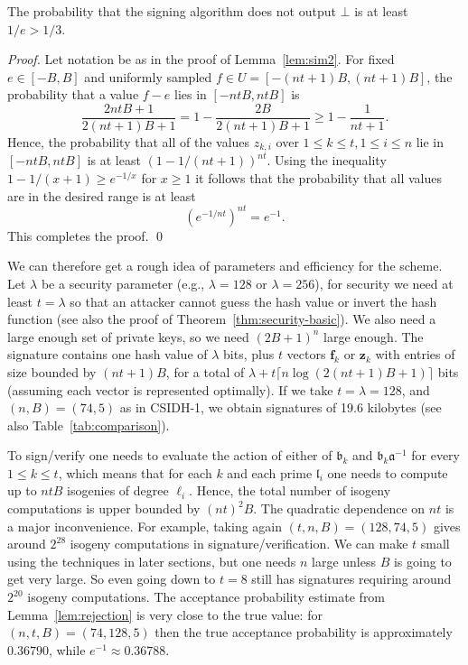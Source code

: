 \documentclass{llncs}
\renewcommand{\a}{\mathfrak{a}}
\renewcommand{\b}{\mathfrak{b}}
\renewcommand{\l}{\mathfrak{l}}
\newcommand{\f}{\mathbf{f}}
\newcommand{\z}{\mathbf{z}}
\begin{document}
\begin{lemma}\label{lem:rejection}
The probability that the signing algorithm does not output $\bot$ is at least $1/e > 1/3$.
\end{lemma}

\begin{proof}
Let notation be as in the proof of Lemma~\ref{lem:sim2}.
For fixed $e \in [-B, B]$ and uniformly sampled $f \in U = [-(nt+1)B, (nt+1)B]$, the probability that a value $f-e$ lies in $[-ntB, ntB]$ is
\[
   \frac{2ntB + 1}{2(nt+1)B + 1}  = 1 - \frac{2B}{2(nt+1)B + 1} \ge 1 - \frac{1}{nt+1}.
\]
Hence, the probability that all of the values $z_{k,i}$ over $1 \le k \le t, 1 \le i \le n$ lie in $[-ntB, ntB]$ is at least $(1 - 1/(nt+1))^{nt}$.
Using the inequality $1 - 1/(x+1) \ge e^{-1/x}$ for $x \ge 1$ it follows that the probability that all values are in the desired range is at least
\[
   \left( e^{-1/nt} \right)^{nt} = e^{-1}.
\]
This completes the proof. \qed
\end{proof}





We can therefore get a rough idea of parameters and efficiency for the scheme.
Let $\lambda$ be a security parameter (e.g., $\lambda=128$ or $\lambda=256$), for security
we need at least $t=\lambda$ so that an attacker cannot guess the hash value or invert the hash function (see also the proof of Theorem~\ref{thm:security-basic}).
We also need a large enough set of private keys, so we need $(2B+1)^n$ large enough.
The signature contains one hash value of $\lambda$ bits, plus $t$ vectors $\f_k$ or $\z_k$ with entries of size bounded by $(nt+1)B$, for a total of $\lambda + t\lceil n\log(2(nt+1)B + 1)\rceil$ bits (assuming each vector is represented optimally). If we take $t=\lambda=128$, and $(n,B)=(74,5)$ as in CSIDH-1, we obtain signatures of 19.6 kilobytes (see also Table~\ref{tab:comparison}).

To sign/verify one needs to evaluate the action of either of $\b_k$ and $\b_k\a^{-1}$ for every $1\le k\le t$,
which means that for each $k$ and each prime $\l_i$ one needs to compute up to $ntB$ isogenies of degree $\ell_i$.
Hence, the total number of isogeny computations is upper bounded by $(nt)^2 B$.
The quadratic dependence on $nt$ is a major inconvenience.
For example, taking again $(t,n,B)=(128,74,5)$ gives around $2^{28}$ isogeny computations in signature/verification.
We can make $t$ small using the techniques in later sections, but one needs $n$ large unless $B$ is going to get very large. So even going down to $t=8$ still has signatures requiring around $2^{20}$ isogeny computations.
The acceptance probability estimate from Lemma~\ref{lem:rejection} is very close to the true value: for $(n,t,B)=(74,128,5)$ then the true acceptance probability is approximately $0.36790$, while $e^{-1} \approx 0.36788$.
\end{document}
